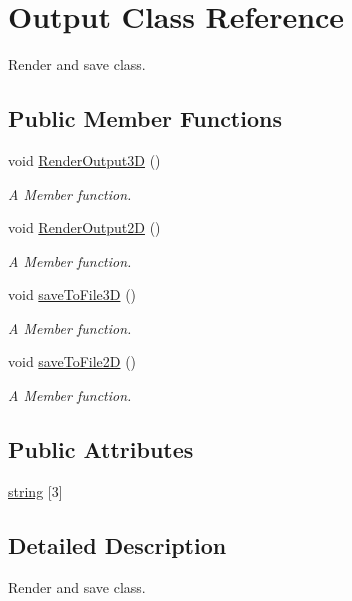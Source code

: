 \hypertarget{classOutput}{}\section{Output Class Reference}
\label{classOutput}


Render and save class.  


\subsection*{Public Member Functions}
\begin{DoxyCompactItemize}
\item 
void \hyperlink{classOutput_a50c6da843dbf27d6238ed07082b31839}{Render\+Output3D} ()
\begin{DoxyCompactList}\small\item\em A Member function. \end{DoxyCompactList}\item 
void \hyperlink{classOutput_a9766c258cad838c5779e0abc778a530d}{Render\+Output2D} ()
\begin{DoxyCompactList}\small\item\em A Member function. \end{DoxyCompactList}\item 
void \hyperlink{classOutput_aa16a2893d743f7c218c026efa3e65718}{save\+To\+File3D} ()
\begin{DoxyCompactList}\small\item\em A Member function. \end{DoxyCompactList}\item 
void \hyperlink{classOutput_aa9ea0df4774ce32a319bdb1b3a6712a8}{save\+To\+File2D} ()
\begin{DoxyCompactList}\small\item\em A Member function. \end{DoxyCompactList}\end{DoxyCompactItemize}
\subsection*{Public Attributes}
\begin{DoxyCompactItemize}
\item 
\hyperlink{classOutput_afb80842d973398a94444913d2c9167d3}{string} \mbox{[}3\mbox{]}
\end{DoxyCompactItemize}


\subsection{Detailed Description}
Render and save class. 

